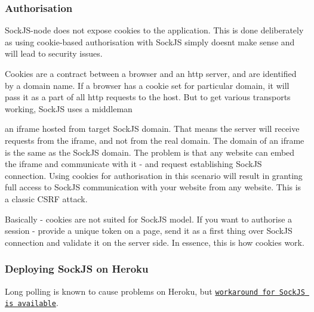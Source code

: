 \subsubsection*{Authorisation}

Sock\+J\+S-\/node does not expose cookies to the application. This is done deliberately as using cookie-\/based authorisation with Sock\+JS simply doesn\textquotesingle{}t make sense and will lead to security issues.

Cookies are a contract between a browser and an http server, and are identified by a domain name. If a browser has a cookie set for particular domain, it will pass it as a part of all http requests to the host. But to get various transports working, Sock\+JS uses a middleman
\begin{DoxyItemize}
\item an iframe hosted from target Sock\+JS domain. That means the server will receive requests from the iframe, and not from the real domain. The domain of an iframe is the same as the Sock\+JS domain. The problem is that any website can embed the iframe and communicate with it -\/ and request establishing Sock\+JS connection. Using cookies for authorisation in this scenario will result in granting full access to Sock\+JS communication with your website from any website. This is a classic C\+S\+RF attack.
\end{DoxyItemize}

Basically -\/ cookies are not suited for Sock\+JS model. If you want to authorise a session -\/ provide a unique token on a page, send it as a first thing over Sock\+JS connection and validate it on the server side. In essence, this is how cookies work.

\subsubsection*{Deploying Sock\+JS on Heroku}

Long polling is known to cause problems on Heroku, but \href{https://github.com/sockjs/sockjs-node/issues/57#issuecomment-5242187}{\tt workaround for Sock\+JS is available}. 
